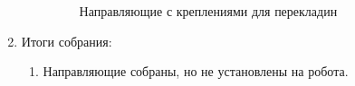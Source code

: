 \begin{enumerate}
\begin{enumerate}
\begin{figure}[H]
\begin{minipage}[h]{0.47\linewidth}
      	\end{minipage}
      	\caption{Направляющие с креплениями для перекладин}
      \end{figure}
      
    \end{enumerate}
    
	\item Итоги собрания: 
	\begin{enumerate}
	  \item Направляющие собраны, но не установлены на робота.


\end{enumerate}
\end{enumerate}
